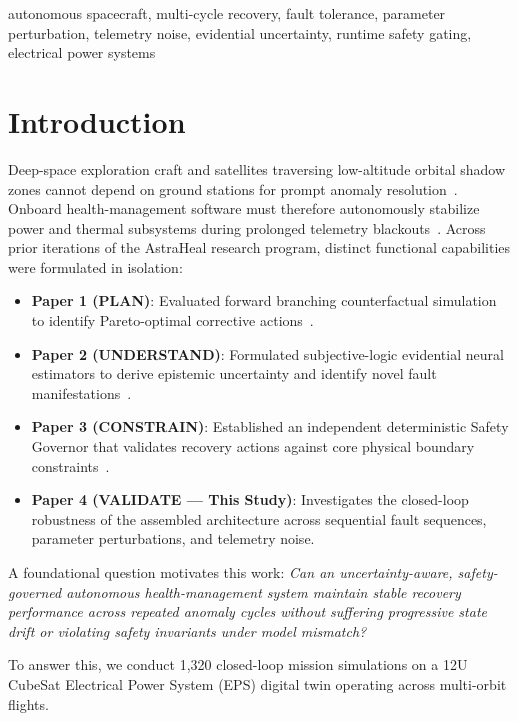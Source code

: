 \documentclass[conference]{IEEEtran}
\begin{document}
\begin{IEEEkeywords}
\setlength{\parindent}{0pt}
autonomous spacecraft, multi-cycle recovery, fault tolerance, parameter perturbation, telemetry noise, evidential uncertainty, runtime safety gating, electrical power systems
\end{IEEEkeywords}

\section{Introduction}

Deep-space exploration craft and satellites traversing low-altitude orbital shadow zones cannot depend on ground stations for prompt anomaly resolution~\cite{chien2005autonomous}. Onboard health-management software must therefore autonomously stabilize power and thermal subsystems during prolonged telemetry blackouts~\cite{muscettola1998remote}. Across prior iterations of the AstraHeal research program, distinct functional capabilities were formulated in isolation:
\begin{itemize}
    \item \textbf{Paper 1 (PLAN)}: Evaluated forward branching counterfactual simulation to identify Pareto-optimal corrective actions~\cite{thambisetty2026astraheal}.
    \item \textbf{Paper 2 (UNDERSTAND)}: Formulated subjective-logic evidential neural estimators to derive epistemic uncertainty and identify novel fault manifestations~\cite{astraheal2026paper2}.
    \item \textbf{Paper 3 (CONSTRAIN)}: Established an independent deterministic Safety Governor that validates recovery actions against core physical boundary constraints~\cite{astraheal2026paper3}.
    \item \textbf{Paper 4 (VALIDATE --- This Study)}: Investigates the closed-loop robustness of the assembled architecture across sequential fault sequences, parameter perturbations, and telemetry noise.
\end{itemize}

A foundational question motivates this work: \textit{Can an uncertainty-aware, safety-governed autonomous health-management system maintain stable recovery performance across repeated anomaly cycles without suffering progressive state drift or violating safety invariants under model mismatch?}

To answer this, we conduct 1,320 closed-loop mission simulations on a 12U CubeSat Electrical Power System (EPS) digital twin operating across multi-orbit flights.
\end{document}
